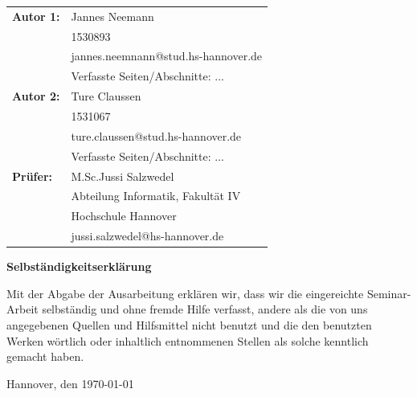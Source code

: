 \documentclass{llncs}
\begin{document}
\newpage \thispagestyle{empty}
\begin{tabular}{ll}
  {\bfseries\sffamily Autor 1:} & Jannes Neemann                      \\
                                & 1530893                             \\
                                & jannes.neemnann@stud.hs-hannover.de \\
                                & Verfasste Seiten/Abschnitte: ...
  \\[5ex]
  {\bfseries\sffamily Autor 2:} & Ture Claussen                        \\
                                & 1531067                             \\
                                & ture.claussen@stud.hs-hannover.de   \\
                                & Verfasste Seiten/Abschnitte: ...    \\[5ex]
  {\bfseries\sffamily Prüfer:}  & M.Sc.Jussi Salzwedel                \\

                                & Abteilung Informatik, Fakultät IV   \\
                                & Hochschule Hannover                 \\
                                & jussi.salzwedel@hs-hannover.de
\end{tabular}
\vfill

\begin{center} \sffamily\bfseries Selbständigkeitserklärung \end{center}

Mit der Abgabe der Ausarbeitung erklären wir, dass wir die eingereichte Seminar-Arbeit
selbständig und ohne fremde Hilfe verfasst, andere als die von uns angegebenen Quellen
und Hilfsmittel nicht benutzt und die den benutzten Werken wörtlich oder
inhaltlich entnommenen Stellen als solche kenntlich gemacht haben.
\vspace*{7ex}

Hannover, den \today \hfill

\pagebreak

\tableofcontents  %

\pagebreak

\begin{abstract}
  \keywords{}
\end{abstract}
%
%
%
\end{document}
